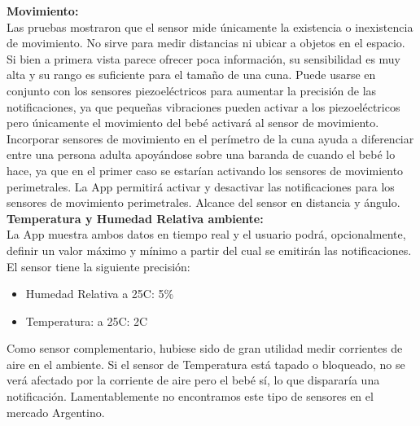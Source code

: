 \documentclass{IEEEtran}
\begin{document}
\textbf{Movimiento:}\\
Las pruebas mostraron que el sensor mide únicamente la existencia o inexistencia de movimiento. No sirve para medir distancias ni ubicar a objetos en el espacio.
Si bien a primera vista parece ofrecer poca información, su sensibilidad es muy alta y su rango es suficiente para el tamaño de una cuna. Puede usarse en conjunto con los sensores piezoeléctricos para aumentar la precisión de las notificaciones, ya que pequeñas vibraciones pueden activar a los piezoeléctricos pero únicamente el movimiento del bebé activará al sensor de movimiento.
Incorporar sensores de movimiento en el perímetro de la cuna ayuda a diferenciar entre una persona adulta apoyándose sobre una baranda de cuando el bebé lo hace, ya que en el primer caso se estarían activando los sensores de movimiento perimetrales.
La App permitirá activar y desactivar las notificaciones para los sensores de movimiento perimetrales.
Alcance del sensor en distancia y ángulo.\\

\textbf{Temperatura y Humedad Relativa ambiente:}\\
La App muestra ambos datos en tiempo real y el usuario podrá, opcionalmente, definir un valor máximo y mínimo a partir del cual se emitirán las notificaciones.\\
El sensor tiene la siguiente precisión:
\begin{itemize}
    \item Humedad Relativa a 25\textordmasculine C:  5\%
    \item Temperatura: a 25\textordmasculine C:  2\textordmasculine C
\end{itemize}

Como sensor complementario, hubiese sido de gran utilidad medir corrientes de aire en el ambiente. Si el sensor de Temperatura está tapado o bloqueado, no se verá afectado por la corriente de aire pero el bebé sí, lo que dispararía una notificación. Lamentablemente no encontramos este tipo de sensores en el mercado Argentino.\\
\end{document}

